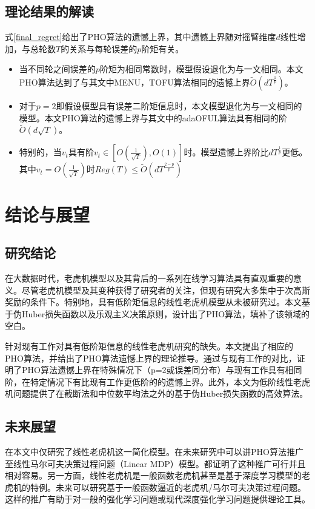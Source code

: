 \documentclass[UTF8,a4paper,10.5pt]{ctexart}
\begin{document}
\subsection{理论结果的解读}
式\ref{final_regret}给出了PHO算法的遗憾上界，其中遗憾上界随对摇臂维度$d$线性增加，与总轮数$T$的关系与每轮误差的$p$阶矩有关。
\begin{itemize}
	\item 当不同轮之间误差的$p$阶矩为相同常数时，模型假设退化为与\cite{Shao18}一文相同。本文PHO算法达到了与其文中MENU，TOFU算法相同的遗憾上界$\tilde{O}(dT^{\frac{1}{p}})$。
	\item 对于$p=2$即假设模型具有误差二阶矩信息时，本文模型退化为与\cite{Xiang23}一文相同的模型。本文PHO算法的遗憾上界与其文中的adaOFUL算法具有相同的阶$\tilde{O}(d\sqrt{T})$。
	\item 特别的，当$v_t$具有阶$v_t\in\left[O(\frac{1}{\sqrt{T}}),O(1)\right]$时。模型遗憾上界阶比$dT^{\frac{1}{p}}$更低。其中$v_t = O(\frac{1}{\sqrt{T}})$时$Reg(T)\leq \tilde{O}(dT^{\frac{2-p}{p}})$
\end{itemize}


\section{结论与展望}
\subsection{研究结论}
在大数据时代，老虎机模型以及其背后的一系列在线学习算法具有直观重要的意义。尽管老虎机模型及其变种获得了研究者的关注，但现有研究大多集中于次高斯奖励的条件下。特别地，具有低阶矩信息的线性老虎机模型从未被研究过。本文基于伪Huber损失函数以及乐观主义决策原则，设计出了PHO算法，填补了该领域的空白。

针对现有工作对具有低阶矩信息的线性老虎机研究的缺失。本文提出了相应的PHO算法，并给出了PHO算法遗憾上界的理论推导。通过与现有工作的对比，证明了PHO算法遗憾上界在特殊情况下（p=2或误差同分布）与现有工作具有相同阶，在特定情况下有比现有工作更低阶的的遗憾上界。此外，本文为低阶线性老虎机问题提供了在截断法和中位数平均法之外的基于伪Huber损失函数的高效算法。

\subsection{未来展望}
在本文中仅研究了线性老虎机这一简化模型。在未来研究中可以讲PHO算法推广至线性马尔可夫决策过程问题（Linear MDP）模型。\cite{Xiang23}\cite{Zhou21}都证明了这种推广可行并且相对容易。另一方面，线性老虎机是一般函数老虎机甚至是基于深度学习模型的老虎机的特例。未来可以研究基于一般函数逼近的老虎机/马尔可夫决策过程问题。这样的推广有助于对一般的强化学习问题或现代深度强化学习问题提供理论工具。
\end{document}
